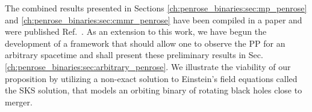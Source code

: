 The combined results presented in Sections \ref{ch:penrose_binaries:sec:mp_penrose} and \ref{ch:penrose_binaries:sec:cmmr_penrose} have been compiled in a paper and were published Ref.~\cite{PhysRevD.104.124025}. As an extension to this work, we have begun the development of a framework that should allow one to observe the PP for an arbitrary spacetime and shall present these preliminary results in Sec. \ref{ch:penrose_binaries:sec:arbitrary_penrose}. We illustrate the viability of our proposition by utilizing a non-exact solution to Einstein's field equations called the SKS solution, that models an orbiting binary of rotating black holes close to merger.